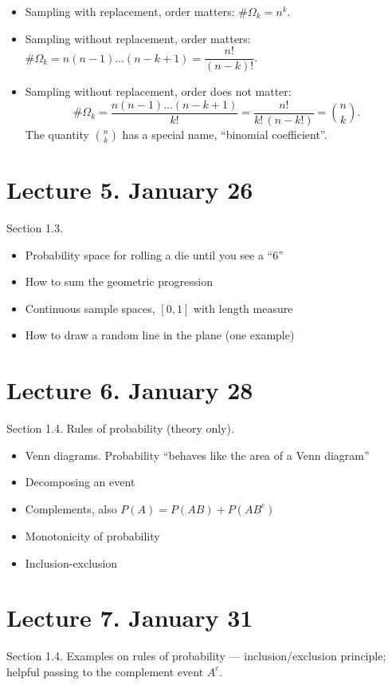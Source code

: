 \documentclass[letterpaper,11pt,oneside,reqno]{amsart}
\numberwithin{equation}{section}
\theoremstyle{definition}
\begin{document}
\begin{itemize}
	\item Sampling with replacement, order matters: $\# \Omega_k=n^k$.
	\item Sampling without replacement, order matters: $\# \Omega_k=n(n-1)\ldots (n-k+1)=\dfrac{n!}{(n-k)!}$.
	\item Sampling without replacement, order does not matter:
		$$\# \Omega_k=\dfrac{n(n-1)\ldots(n-k+1) }{k!}
		=\dfrac{n!}{k!\, (n-k!)}=\binom nk .$$
		The quantity $\binom nk$ has a special name, ``binomial coefficient''.
\end{itemize}

\section{Lecture 5. January 26}

Section 1.3.
\begin{itemize}
	\item Probability space for rolling a die until you see a ``6''
	\item How to sum the geometric progression
	\item Continuous sample spaces, $[0,1]$ with length measure
	\item How to draw a random line in the plane (one example)
\end{itemize}

\section{Lecture 6. January 28}

Section 1.4. Rules of probability (theory only).
\begin{itemize}
	\item Venn diagrams. Probability ``behaves like the area of a Venn diagram''
	\item Decomposing an event
	\item Complements, also $P(A)=P(AB)+P(AB^c)$
	\item Monotonicity of probability
	\item Inclusion-exclusion
\end{itemize}

\section{Lecture 7. January 31}
Section 1.4. Examples on rules of probability --- inclusion/exclusion principle; helpful passing to 
the complement event
$A^c$.
\end{document}
